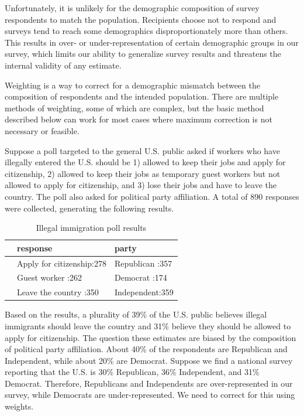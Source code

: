 \documentclass[
]{book}
\begin{document}
Unfortunately, it is unlikely for the demographic composition of survey respondents to match the population. Recipients choose not to respond and surveys tend to reach some demographics disproportionately more than others. This results in over- or under-representation of certain demographic groups in our survey, which limits our ability to generalize survey results and threatens the internal validity of any estimate.

Weighting is a way to correct for a demographic mismatch between the composition of respondents and the intended population. There are multiple methods of weighting, some of which are complex, but the basic method described below can work for most cases where maximum correction is not necessary or feasible.

Suppose a poll targeted to the general U.S. public asked if workers who have illegally entered the U.S. should be 1) allowed to keep their jobs and apply for citizenship, 2) allowed to keep their jobs as temporary guest workers but not allowed to apply for citizenship, and 3) lose their jobs and have to leave the country. The poll also asked for political party affiliation. A total of 890 responses were collected, generating the following results.

\begin{table}

\caption{\label{tab:unnamed-chunk-266}Illegal immigration poll results}
\centering
\begin{tabular}[t]{l|l|l}
\hline
  &                  response &         party\\
\hline
 & Apply for citizenship:278 & Republican :357\\
\hline
 & Guest worker         :262 & Democrat   :174\\
\hline
 & Leave the country    :350 & Independent:359\\
\hline
\end{tabular}
\end{table}

Based on the results, a plurality of 39\% of the U.S. public believes illegal immigrants should leave the country and 31\% believe they should be allowed to apply for citizenship. The question these estimates are biased by the composition of political party affiliation. About 40\% of the respondents are Republican and Independent, while about 20\% are Democrat. Suppose we find a national survey reporting that the U.S. is 30\% Republican, 36\% Independent, and 31\% Democrat. Therefore, Republicans and Independents are over-represented in our survey, while Democrats are under-represented. We need to correct for this using weights.
\end{document}
